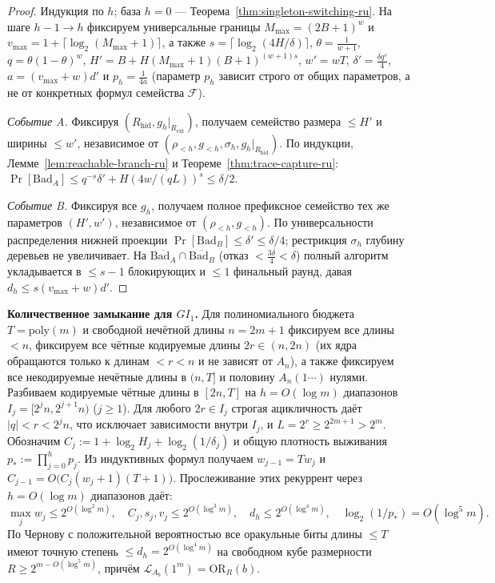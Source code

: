 \documentclass[11pt,a4paper]{article}
\theoremstyle{definition}
\theoremstyle{remark}
\newcommand{\OR}{\mathrm{OR}}
\newcommand{\Prb}{\Pr}
\newcommand{\GI}{GI_1}
\begin{document}
\begin{proof}
Индукция по $h$; база $h = 0$ — Теорема~\ref{thm:singleton-switching-ru}. На шаге $h-1 \to h$ фиксируем универсальные границы $M_{\max} = (2B+1)^w$ и $v_{\max} = 1 + \lceil \log_2(M_{\max}+1)\rceil$, а также $s = \lceil \log_2(4H/\delta)\rceil$, $\theta = \frac{1}{w+1}$, $q = \theta(1-\theta)^w$, $H' = B + H(M_{\max}+1)(B+1)^{(w+1)s}$, $w' = wT$, $\delta' = \frac{\delta q^s}{4}$, $a = (v_{\max}+w)d'$ и $p_h = \frac{1}{4a}$ (параметр $p_h$ зависит строго от общих параметров, а не от конкретных формул семейства $\mathcal{F}$).

\emph{Событие A.} Фиксируя $(R_{\mathrm{hid}}, g_h|_{R_{\mathrm{ext}}})$, получаем семейство размера $\le H'$ и ширины $\le w'$, независимое от $(\rho_{<h}, g_{<h}, \sigma_h, g_h|_{R_{\mathrm{hid}}})$. По индукции, Лемме~\ref{lem:reachable-branch-ru} и Теореме~\ref{thm:trace-capture-ru}: $\Prb[\mathrm{Bad}_A] \le q^{-s}\delta' + H(4w/(qL))^s \le \delta/2$.

\emph{Событие B.} Фиксируя все $g_h$, получаем полное префиксное семейство тех же параметров $(H', w')$, независимое от $(\rho_{<h}, g_{<h})$. По универсальности распределения нижней проекции $\Prb[\mathrm{Bad}_B] \le \delta' \le \delta/4$; рестрикция $\sigma_h$ глубину деревьев не увеличивает. На $\overline{\mathrm{Bad}_A} \cap \overline{\mathrm{Bad}_B}$ (отказ $< \frac{3\delta}{4} < \delta$) полный алгоритм укладывается в $\le s - 1$ блокирующих и $\le 1$ финальный раунд, давая $d_h \le s(v_{\max}+w)d'$.
\end{proof}

\textbf{Количественное замыкание для $\GI$.} Для полиномиального бюджета $T = \mathrm{poly}(m)$ и свободной нечётной длины $n = 2m+1$ фиксируем все длины $< n$, фиксируем все чётные кодируемые длины $2r \in (n, 2n)$ (их ядра обращаются только к длинам $< r < n$ и не зависят от $A_n$), а также фиксируем все некодируемые нечётные длины в $(n, T]$ и половину $A_n(1\cdots)$ нулями. Разбиваем кодируемые чётные длины в $[2n, T]$ на $h = O(\log m)$ диапазонов $I_j = [2^j n, 2^{j+1} n)$ ($j \ge 1$). Для любого $2r \in I_j$ строгая ацикличность даёт $|q| < r < 2^j n$, что исключает зависимости внутри $I_j$, и $L = 2^r \ge 2^{2m+1} > 2^m$. Обозначим $C_j := 1 + \log_2 H_j + \log_2(1/\delta_j)$ и общую плотность выживания $p_* := \prod_{j=0}^h p_j$. Из индуктивных формул получаем $w_{j-1} = T w_j$ и $C_{j-1} = O\bigl(C_j (w_j + 1)(T + 1)\bigr)$. Прослеживание этих рекуррент через $h = O(\log m)$ диапазонов даёт:
\[
  \max_j w_j \le 2^{O(\log^2 m)},\quad
  C_j, s_j, v_j \le 2^{O(\log^3 m)},\quad
  d_h \le 2^{O(\log^4 m)},\quad
  \log_2(1/p_*) = O(\log^5 m).
\]
По Чернову с положительной вероятностью все оракульные биты длины $\le T$ имеют точную степень $\le d_h = 2^{O(\log^4 m)}$ на свободном кубе размерности $R \ge 2^{m - O(\log^5 m)}$, причём $\mathcal{L}_{A_b}(1^m) = \OR_R(b)$.
\end{document}
